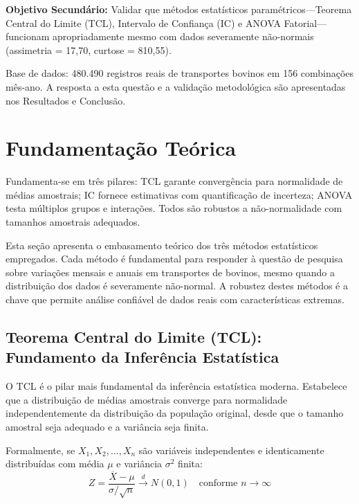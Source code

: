 \documentclass[12pt,a4paper]{article}
\begin{document}
\textbf{Objetivo Secundário:} Validar que métodos estatísticos paramétricos---Teorema Central do Limite (TCL), Intervalo de Confiança (IC) e ANOVA Fatorial---funcionam apropriadamente mesmo com dados severamente não-normais (assimetria = 17,70, curtose = 810,55).

Base de dados: 480.490 registros reais de transportes bovinos em 156 combinações mês-ano. A resposta a esta questão e a validação metodológica são apresentadas nos Resultados e Conclusão.

\newpage

\newpage
\section{Fundamentação Teórica}

Fundamenta-se em três pilares: TCL garante convergência para normalidade de médias amostrais; IC fornece estimativas com quantificação de incerteza; ANOVA testa múltiplos grupos e interações. Todos são robustos a não-normalidade com tamanhos amostrais adequados.

Esta seção apresenta o embasamento teórico dos três métodos estatísticos empregados. Cada método é fundamental para responder à questão de pesquisa sobre variações mensais e anuais em transportes de bovinos, mesmo quando a distribuição dos dados é severamente não-normal. A robustez destes métodos é a chave que permite análise confiável de dados reais com características extremas.

\subsection{Teorema Central do Limite (TCL): Fundamento da Inferência Estatística}

O TCL é o pilar mais fundamental da inferência estatística moderna. Estabelece que a distribuição de médias amostrais converge para normalidade independentemente da distribuição da população original, desde que o tamanho amostral seja adequado e a variância seja finita.

Formalmente, se $X_1, X_2, \ldots, X_n$ são variáveis independentes e identicamente distribuídas com média $\mu$ e variância $\sigma^2$ finita:
\begin{equation}
Z = \frac{\overline{X} - \mu}{\sigma/\sqrt{n}} \xrightarrow{d} N(0,1) \quad \text{conforme } n \to \infty
\end{equation}
\end{document}
